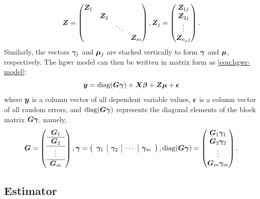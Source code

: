 \documentclass[times]{interact}
\theoremstyle{plain}%
\theoremstyle{definition}
\theoremstyle{remark}
\begin{document}
\begin{equation*}
  \bm{Z} = \begin{pmatrix}
    \bm{Z}_1 & & & \\ 
    & \bm{Z}_2 & & \\ 
    & & \ddots & \\ 
    & & & \bm{Z}_m
  \end{pmatrix},
  \bm{Z}_j = \begin{pmatrix}
    \bm{Z}_{1j} \\ \bm{Z}_{2j} \\ \vdots \\ \bm{Z}_{n_{j}j} \\
  \end{pmatrix}.
\end{equation*}
Similarly, the vectors $\bm{\gamma}_j$ and $\bm{\mu}_j$ are stacked vertically to form $\bm{\gamma}$ and $\bm{\mu}$, respectively.
The \gls{hgwr} model can then be written in matrix form as \autoref{equ:hgwr-model}:
\begin{equation}\label{equ:hgwr-model}
  \bm{y} = \operatorname{diag}(\bm{G}\bm{\gamma}) + \bm{X}\bm{\beta} + \bm{Z}\bm{\mu} + \bm{\epsilon}
\end{equation}
where $\bm{y}$ is a column vector of all dependent variable values,
$\bm{\epsilon}$ is a column vector of all random errors,
and $\operatorname{diag}(\bm{G}\bm{\gamma})$ represents the diagonal elements of the block matrix $\bm{G}\bm{\gamma}$, namely,
\begin{equation*}
  \bm{G} = \left(\begin{array}{c}
    \bm{G}_1 \\\hline
    \bm{G}_2 \\\hline
    \vdots \\\hline
    \bm{G}_m
  \end{array}\right),
  \bm{\gamma} = \left(\begin{array}{c|c|c|c}
    \bm{\gamma}_1 & \bm{\gamma}_2 & \cdots & \bm{\gamma}_m
  \end{array}\right),
  \operatorname{diag}(\bm{G}\bm{\gamma}) = \begin{pmatrix}
    \bm{G}_1\bm{\gamma}_1 \\
    \bm{G}_2\bm{\gamma}_2 \\
    \vdots \\
    \bm{G}_m\bm{\gamma}_m \\
  \end{pmatrix}.
\end{equation*}

\subsection{Estimator}
\end{document}
